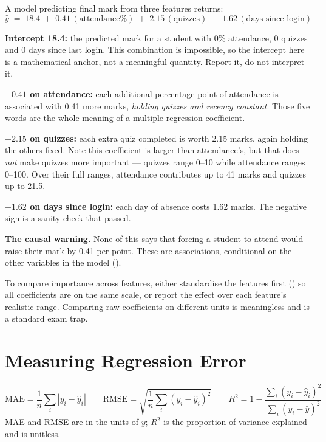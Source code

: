 \begin{worked}
A model predicting final mark from three features returns:
\[
\hat{y} \;=\; 18.4 \;+\; 0.41\,(\text{attendance\%}) \;+\; 2.15\,(\text{quizzes}) \;-\; 1.62\,(\text{days\_since\_login})
\]

\smallskip
\textbf{Intercept 18.4:} the predicted mark for a student with 0\% attendance, 0
quizzes and 0 days since last login. This combination is impossible, so the
intercept here is a mathematical anchor, not a meaningful quantity. Report it, do
not interpret it.

\textbf{$+0.41$ on attendance:} each additional percentage point of attendance is
associated with 0.41 more marks, \emph{holding quizzes and recency constant}. Those
five words are the whole meaning of a multiple-regression coefficient.

\textbf{$+2.15$ on quizzes:} each extra quiz completed is worth 2.15 marks, again
holding the others fixed. Note this coefficient is larger than attendance's, but
that does \emph{not} make quizzes more important --- quizzes range 0--10 while
attendance ranges 0--100. Over their full ranges, attendance contributes up to 41
marks and quizzes up to 21.5.

\textbf{$-1.62$ on days since login:} each day of absence costs 1.62 marks. The
negative sign is a sanity check that passed.

\smallskip
\textbf{The causal warning.} None of this says that forcing a student to attend
would raise their mark by 0.41 per point. These are associations, conditional on
the other variables in the model ().
\end{worked}

\begin{alertbox}
To compare importance across features, either standardise the features first
() so all coefficients are on the same scale, or report the effect
over each feature's realistic range. Comparing raw coefficients on different units
is meaningless and is a standard exam trap.
\end{alertbox}

\section{Measuring Regression Error}

\begin{definitionbox}
\[
\text{MAE} = \frac{1}{n}\sum_{i}\left|y_i - \hat{y}_i\right|
\qquad
\text{RMSE} = \sqrt{\frac{1}{n}\sum_{i}\left(y_i - \hat{y}_i\right)^2}
\qquad
R^2 = 1 - \frac{\sum_i (y_i-\hat{y}_i)^2}{\sum_i (y_i-\bar{y})^2}
\]
MAE and RMSE are in the units of $y$; $R^2$ is the proportion of variance explained
and is unitless.
\end{definitionbox}

